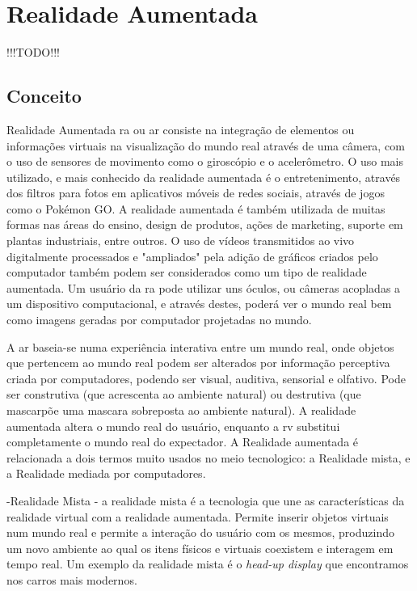 \documentclass{report}
\begin{document}
\chapter{Realidade Aumentada}
\label{chap.a-realidade-aumentada}
!!!TODO!!!

\section{Conceito}
Realidade Aumentada \ac{ra} ou \ac{ar} consiste na integração de elementos ou informações virtuais na visualização do mundo real através de uma câmera, com o uso de sensores de movimento como o giroscópio e o acelerômetro. O uso mais utilizado, e mais conhecido da realidade aumentada é o entretenimento, através dos filtros para fotos em aplicativos móveis de redes sociais, através de jogos como o Pokémon GO. A realidade aumentada é também utilizada de muitas formas nas áreas do ensino, design de produtos, ações de marketing, suporte em plantas industriais, entre outros. O uso de vídeos transmitidos ao vivo digitalmente processados e "ampliados" pela adição de gráficos criados pelo computador também podem ser considerados como um tipo de realidade aumentada. Um usuário da \ac{ra} pode utilizar uns óculos, ou câmeras acopladas a um dispositivo computacional, e através destes, poderá ver o mundo real bem como imagens geradas por computador projetadas no mundo.

A \ac{ar} baseia-se numa experiência interativa entre um mundo real, onde objetos que pertencem ao mundo real podem ser alterados por informação perceptiva criada por computadores, podendo ser visual, auditiva, sensorial e olfativo. Pode ser construtiva (que acrescenta ao ambiente natural) ou destrutiva (que mascarpõe uma mascara sobreposta ao ambiente natural). A realidade aumentada altera o mundo real do usuário, enquanto a \ac{rv} substitui completamente o mundo real do expectador. A Realidade aumentada é relacionada a dois termos muito usados no meio tecnologico: a Realidade mista, e a Realidade mediada por computadores. 

-Realidade Mista - a realidade mista é a tecnologia que une as características da realidade virtual com a realidade aumentada. Permite inserir objetos virtuais num mundo real e permite a interação do usuário com os mesmos, produzindo um novo ambiente ao qual os itens físicos e virtuais coexistem e interagem em tempo real. Um exemplo da realidade mista é o \textit{head-up display} que encontramos nos carros mais modernos.
\end{document}
